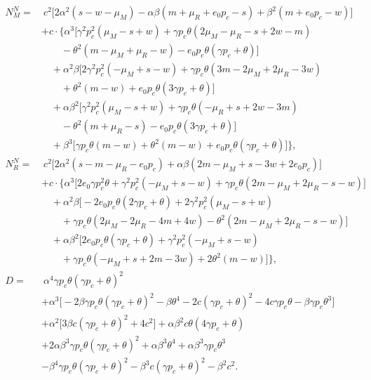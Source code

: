 \documentclass[authoryear,preprint,review,times,10pt]{elsarticle}
\begin{document}
\begin{equation}
\begin{aligned}
N_M^{N} =&\ c^{2}\big[2\alpha^{2}(s - w - \mu_{M}) - \alpha\beta(m + \mu_{R} + e_{0} p_{c} - s) + \beta^{2}(m + e_{0} p_{c} - w)\big] \\
&+ c \cdot \big\{ \alpha^{3}\big[\gamma^{2} p_{c}^{2}(\mu_{M} - s + w) + \gamma p_{c}\theta(2\mu_{M} - \mu_{R} - s + 2w - m) \\
&\qquad - \theta^{2}(m - \mu_{M} + \mu_{R} - w) - e_{0} p_{c}\theta(\gamma p_{c} + \theta)\big] \\
&\quad + \alpha^{2}\beta\big[2\gamma^{2} p_{c}^{2}(-\mu_{M} + s - w) + \gamma p_{c}\theta(3m - 2\mu_{M} + 2\mu_{R} - 3w) \\
&\qquad + \theta^{2}(m - w) + e_{0} p_{c}\theta(3\gamma p_{c} + \theta)\big] \\
&\quad + \alpha\beta^{2}\big[\gamma^{2} p_{c}^{2}(\mu_{M} - s + w) + \gamma p_{c}\theta(-\mu_{R} + s + 2w - 3m) \\
&\qquad - \theta^{2}(m + \mu_{R} - s) - e_{0} p_{c}\theta(3\gamma p_{c} + \theta)\big] \\
&\quad + \beta^{3}\big[\gamma p_{c}\theta(m - w) + \theta^{2}(m - w) + e_{0} p_{c}\theta(\gamma p_{c} + \theta)\big] \big\}, \\[3pt]
N_R^{N} =&\ c^{2}\big[2\alpha^{2}(s - m - \mu_{R} - e_{0} p_{c}) + \alpha\beta(2m - \mu_{M} + s - 3w + 2e_{0} p_{c})\big] \\
&+ c \cdot \big\{ \alpha^{3}\big[2e_{0}\gamma p_{c}^{2}\theta + \gamma^{2} p_{c}^{2}(-\mu_{M} + s - w) + \gamma p_{c}\theta(2m - \mu_{M} + 2\mu_{R} - s - w)\big] \\
&\quad + \alpha^{2}\beta\big[-2e_{0} p_{c}\theta(2\gamma p_{c} + \theta) + 2\gamma^{2} p_{c}^{2}(\mu_{M} - s + w) \\
&\qquad + \gamma p_{c}\theta(2\mu_{M} - 2\mu_{R} - 4m + 4w) - \theta^{2}(2m - \mu_{M} + 2\mu_{R} - s - w)\big] \\
&\quad + \alpha\beta^{2}\big[2e_{0} p_{c}\theta(\gamma p_{c} + \theta) + \gamma^{2} p_{c}^{2}(-\mu_{M} + s - w) \\
&\qquad + \gamma p_{c}\theta(-\mu_{M} + s + 2m - 3w) + 2\theta^{2}(m - w)\big] \big\}, \\[3pt]
D =&\ \alpha^{4}\gamma p_{c}\theta(\gamma p_{c} + \theta)^{2} \\
&+ \alpha^{3}\big[-2\beta\gamma p_{c}\theta(\gamma p_{c} + \theta)^{2} - \beta\theta^{4} - 2c(\gamma p_{c} + \theta)^{2} - 4c\gamma p_{c}\theta - \beta\gamma p_{c}\theta^{3}\big] \\
&+ \alpha^{2}\big[3\beta c(\gamma p_{c} + \theta)^{2} + 4c^{2}\big] + \alpha\beta^{2} c\theta(4\gamma p_{c} + \theta) \\
&+ 2\alpha\beta^{3}\gamma p_{c}\theta(\gamma p_{c} + \theta)^{2} + \alpha\beta^{3}\theta^{4} + \alpha\beta^{3}\gamma p_{c}\theta^{3} \\
&- \beta^{4}\gamma p_{c}\theta(\gamma p_{c} + \theta)^{2} - \beta^{3} c(\gamma p_{c} + \theta)^{2} - \beta^{2} c^{2}.
\end{aligned}
\end{equation}
\end{document}
